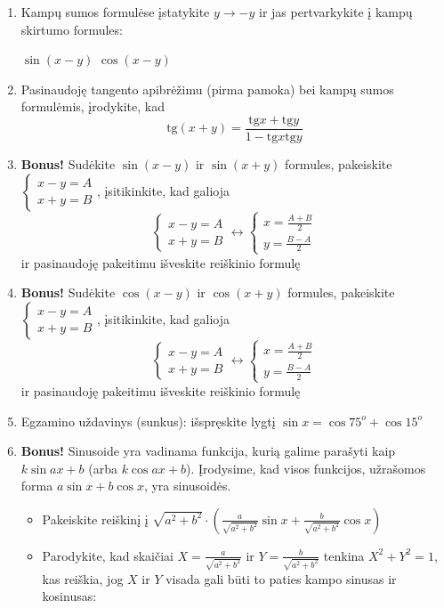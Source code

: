 \documentclass[a4paper]{article}
\newcommand{\tbf}[1]{\textbf{#1}}
\begin{document}
\begin{enumerate}
\item Kampų sumos formulėse įstatykite $y \rightarrow -y$ ir jas pertvarkykite į kampų skirtumo formules:
\begin{tasks}
\task $\sin(x-y)$
\task $\cos(x-y)$
\end{tasks}
\item Pasinaudoję tangento apibrėžimu (pirma pamoka) bei kampų sumos formulėmis, įrodykite, kad 
$$\text{tg}(x+y)=\frac{\text{tg} x+\text{tg} y}{1-\text{tg} x\text{tg} y}$$
\item \tbf{Bonus!} Sudėkite $\sin(x-y)$ ir $\sin(x+y)$ formules, pakeiskite $\begin{cases} x-y=A \\ x+y=B\end{cases}$, įsitikinkite, kad galioja $$\begin{cases}x-y=A \\ x+y=B\end{cases} \leftrightarrow \begin{cases}x=\frac{A+B}{2} \\ y=\frac{B-A}{2}\end{cases}$$ ir pasinaudoję pakeitimu išveskite reiškinio formulę 
\item \tbf{Bonus!} Sudėkite $\cos(x-y)$ ir $\cos(x+y)$ formules, pakeiskite $\begin{cases} x-y=A \\ x+y=B\end{cases}$, įsitikinkite, kad galioja $$\begin{cases}x-y=A \\ x+y=B\end{cases} \leftrightarrow \begin{cases}x=\frac{A+B}{2} \\ y=\frac{B-A}{2}\end{cases}$$ ir pasinaudoję pakeitimu išveskite reiškinio formulę 
\item Egzamino uždavinys (sunkus): išspręskite lygtį $\sin x = \cos 75^o+\cos 15^o$
\item \tbf{Bonus!} Sinusoide yra vadinama funkcija, kurią galime parašyti kaip $k\sin{ax+b}$ (arba $k\cos{ax+b}$). Įrodysime, kad visos funkcijos, užrašomos forma $a\sin x + b\cos x$, yra sinusoidės.
\begin{itemize}
\item Pakeiskite reiškinį į $\sqrt{a^2+b^2} \cdot \left(\frac{a}{\sqrt{a^2+b^2}}\sin x + \frac{b}{\sqrt{a^2+b^2}}\cos x\right)$
\item Parodykite, kad skaičiai $X=\frac{a}{\sqrt{a^2+b^2}}$ ir $Y=\frac{b}{\sqrt{a^2+b^2}}$ tenkina $X^2+Y^2=1$, kas reiškia, jog $X$ ir $Y$ visada gali būti to paties kampo sinusas ir kosinusas:


\end{itemize}
\end{enumerate}
\end{document}
